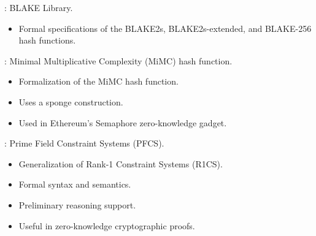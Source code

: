 
\begin{frame}

\newlibtitle

: BLAKE Library.
\begin{itemize}
\item Formal specifications of the BLAKE2s, BLAKE2s-extended, and
  BLAKE-256 hash functions.
\end{itemize}

\end{frame}


\begin{frame}

\newlibtitle

:
Minimal Multiplicative Complexity (MiMC) hash function.
\begin{itemize}
\item Formalization of the MiMC hash function.
\item Uses a sponge construction.
\item Used in Ethereum's Semaphore zero-knowledge gadget.
\end{itemize}

\end{frame}


\begin{frame}

\newlibtitle

:
Prime Field Constraint Systems (PFCS).
\begin{itemize}
\item Generalization of Rank-1 Constraint Systems (R1CS).
\item Formal syntax and semantics.
\item Preliminary reasoning support.
\item Useful in zero-knowledge cryptographic proofs.
\end{itemize}

\end{frame}



